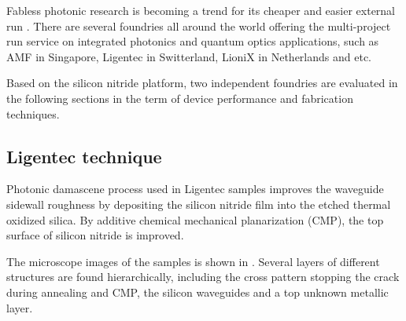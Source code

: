 Fabless photonic research is becoming a trend for its cheaper and easier external run \cite{Hochberg2010}. There are several foundries all around the world offering the multi-project run service on integrated photonics and quantum optics applications, such as AMF in Singapore, Ligentec in Switterland, LioniX in Netherlands and etc. 

Based on the silicon nitride platform, two independent foundries are evaluated in the following sections in the term of device performance and fabrication techniques.

\subsection{Ligentec technique}
Photonic damascene process \cite{Pfeiffer2015a,Pfeiffer2018a} used in Ligentec samples improves the waveguide sidewall roughness by depositing the silicon nitride film into the etched thermal oxidized silica. By additive chemical mechanical planarization (CMP), the top surface of silicon nitride is improved.

The microscope images of the samples is shown in . Several layers of different structures are found hierarchically, including the cross pattern stopping the crack during annealing and CMP, the silicon waveguides and a top unknown metallic layer.

